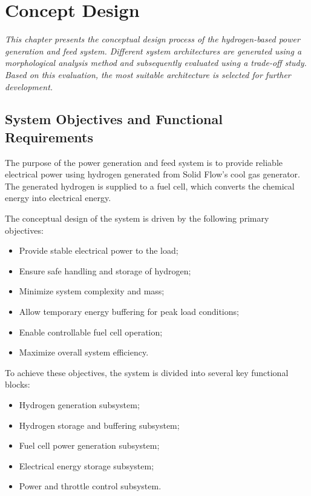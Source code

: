 

\chapter{Concept Design}
\label{chap:concept design}

\emph{This chapter presents the conceptual design process of the hydrogen-based power generation and feed system. Different system architectures are generated using a morphological analysis method and subsequently evaluated using a trade-off study. Based on this evaluation, the most suitable architecture is selected for further development.}

\newpage

\section{System Objectives and Functional Requirements}

The purpose of the power generation and feed system is to provide reliable electrical power using hydrogen generated from Solid Flow's cool gas generator. The generated hydrogen is supplied to a fuel cell, which converts the chemical energy into electrical energy.

The conceptual design of the system is driven by the following primary objectives:

\begin{itemize}
    \item Provide stable electrical power to the load;
    \item Ensure safe handling and storage of hydrogen;
    \item Minimize system complexity and mass;
    \item Allow temporary energy buffering for peak load conditions;
    \item Enable controllable fuel cell operation;
    \item Maximize overall system efficiency.
\end{itemize}

To achieve these objectives, the system is divided into several key functional blocks:

\begin{itemize}
    \item Hydrogen generation subsystem;
    \item Hydrogen storage and buffering subsystem;
    \item Fuel cell power generation subsystem;
    \item Electrical energy storage subsystem;
    \item Power and throttle control subsystem.
\end{itemize}

